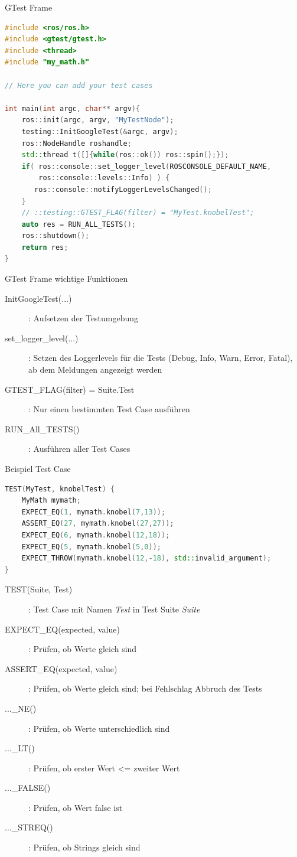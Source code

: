 \documentclass{beamer}
\begin{document}
\begin{frame}[fragile]{GTest Frame}
\begin{lstlisting}[language=c++]
#include <ros/ros.h>
#include <gtest/gtest.h>
#include <thread>
#include "my_math.h"

// Here you can add your test cases

int main(int argc, char** argv){
    ros::init(argc, argv, "MyTestNode");
    testing::InitGoogleTest(&argc, argv);
    ros::NodeHandle roshandle;
    std::thread t([]{while(ros::ok()) ros::spin();});
    if( ros::console::set_logger_level(ROSCONSOLE_DEFAULT_NAME, 
    	ros::console::levels::Info) ) {
       ros::console::notifyLoggerLevelsChanged();
    }
    // ::testing::GTEST_FLAG(filter) = "MyTest.knobelTest";
    auto res = RUN_ALL_TESTS();
    ros::shutdown();
    return res;
}
\end{lstlisting}
\end{frame}

\begin{frame}{GTest Frame wichtige Funktionen}
\begin{description}
	\item[InitGoogleTest(...)]: Aufsetzen der Testumgebung
	\item[set\_logger\_level(...)]: Setzen des Loggerlevels für die Tests (Debug, Info, Warn, Error, Fatal), ab dem Meldungen angezeigt werden
	\item[GTEST\_FLAG(filter) = Suite.Test]: Nur einen bestimmten Test Case ausführen
	\item[RUN\_All\_TESTS()]: Ausführen aller Test Cases
\end{description}
\end{frame}

\begin{frame}[fragile]{Beispiel Test Case}
\begin{lstlisting}[language=c++]
TEST(MyTest, knobelTest) {
    MyMath mymath;
    EXPECT_EQ(1, mymath.knobel(7,13));
    ASSERT_EQ(27, mymath.knobel(27,27));
    EXPECT_EQ(6, mymath.knobel(12,18));
    EXPECT_EQ(5, mymath.knobel(5,0));
    EXPECT_THROW(mymath.knobel(12,-18), std::invalid_argument);
}
\end{lstlisting}
\pause
\begin{description}
	\item[TEST(Suite, Test)]: Test Case mit Namen \textit{Test} in Test Suite \textit{Suite}
	\item[EXPECT\_EQ(expected, value)]: Prüfen, ob Werte gleich sind
	\item[ASSERT\_EQ(expected, value)]: Prüfen, ob Werte gleich sind; bei Fehlschlag Abbruch des Tests
	\item[...\_NE()]: Prüfen, ob Werte unterschiedlich sind
	\item[...\_LT()]: Prüfen, ob erster Wert <= zweiter Wert
	\item[...\_FALSE()]: Prüfen, ob Wert false ist
	\item[...\_STREQ()]: Prüfen, ob Strings gleich sind
\end{description}
\end{frame}
\end{document}
